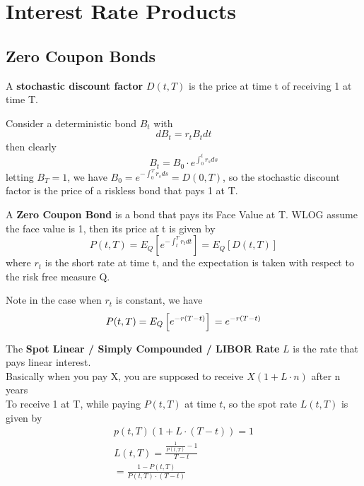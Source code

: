 \section{Interest Rate Products}
\subsection{Zero Coupon Bonds}
\begin{definition}
    A \textbf{stochastic discount factor} $D(t, T)$ is the price at time t of receiving 1 at time T.

    Consider a deterministic bond $B_t$ with 
    \begin{equation}
        dB_t = r_t B_t dt
    \end{equation}
    then clearly
    \begin{equation}
        B_t = B_0 \cdot e^{\int_{0}^{t} r_s ds} 
    \end{equation}
    letting $B_T = 1$, we have $ B_0 = e^{-\int_{0}^{T} r_s ds} = D(0, T)$, so the stochastic discount factor is the price of a riskless bond that pays 1 at T.
\end{definition}
\begin{definition}
    A \textbf{Zero Coupon Bond} is a bond that pays its Face Value at T. 
    WLOG assume the face value is 1, then its price at t is given by
    \begin{equation}
        P(t, T) = E_Q\left[ e^{-\int_{t}^{T} r_t dt }\right] = E_Q\left[ D(t, T) \right]
    \end{equation}
    where $r_t$ is the short rate at time t, and the expectation is taken with respect to the risk free measure Q.

    Note in the case when $r_t$ is constant, we have
    \begin{equation}
        P(t, T) = E_Q\left[ e^{-r(T - t)} \right] \\
        = e^{-r(T - t)}
    \end{equation}
\end{definition}

\begin{definition}
    The \textbf{Spot Linear / Simply Compounded / LIBOR Rate} $L$ is the rate that pays linear interest. \\
    Basically when you pay X, you are supposed to receive $X(1 + L \cdot n)$ after n years \\
    To receive 1 at T, while paying $P(t, T)$ at time $t$, so the spot rate $L(t, T)$ is given by
    \begin{align*}
        p(t, T) (1 + L \cdot (T - t)) = 1 \\
        L(t, T) = \frac{\frac{1}{P(t, T)} - 1}{T - t} \\
        = \frac{1 - P(t, T)}{P(t, T) \cdot (T - t)}
    \end{align*}

\end{definition}

